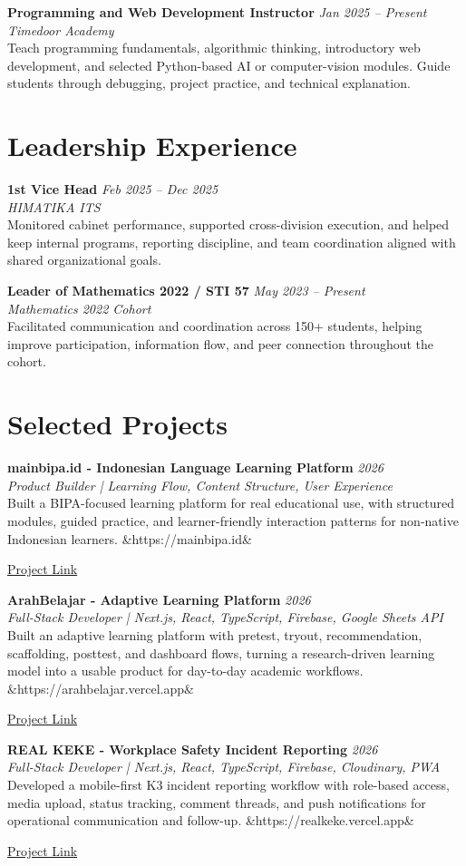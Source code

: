 \documentclass[a4paper,10pt]{article}
\newcommand{\entry}[4]{%
  \textbf{#1} \hfill \textit{#3}\\
  \textit{#2}\\
  {\small #4}\vspace{4pt}
}
\newcommand{\project}[5]{%
  \textbf{#1} \hfill \textit{#2}\\
  \textit{\small #3}\\
  {\small #4}
  \ifx&#5& \else \par{\small \href{#5}{Project Link}} \fi
  \vspace{4pt}
}
\begin{document}
\entry
  {Programming and Web Development Instructor}
  {Timedoor Academy}
  {Jan 2025 -- Present}
  {Teach programming fundamentals, algorithmic thinking, introductory web development, and selected Python-based AI or computer-vision modules. Guide students through debugging, project practice, and technical explanation.}

\section{Leadership Experience}
\entry
  {1st Vice Head}
  {HIMATIKA ITS}
  {Feb 2025 -- Dec 2025}
  {Monitored cabinet performance, supported cross-division execution, and helped keep internal programs, reporting discipline, and team coordination aligned with shared organizational goals.}

\entry
  {Leader of Mathematics 2022 / STI 57}
  {Mathematics 2022 Cohort}
  {May 2023 -- Present}
  {Facilitated communication and coordination across 150+ students, helping improve participation, information flow, and peer connection throughout the cohort.}

\section{Selected Projects}
\project
  {mainbipa.id - Indonesian Language Learning Platform}
  {2026}
  {Product Builder | Learning Flow, Content Structure, User Experience}
  {Built a BIPA-focused learning platform for real educational use, with structured modules, guided practice, and learner-friendly interaction patterns for non-native Indonesian learners.}
  {https://mainbipa.id}

\project
  {ArahBelajar - Adaptive Learning Platform}
  {2026}
  {Full-Stack Developer | Next.js, React, TypeScript, Firebase, Google Sheets API}
  {Built an adaptive learning platform with pretest, tryout, recommendation, scaffolding, posttest, and dashboard flows, turning a research-driven learning model into a usable product for day-to-day academic workflows.}
  {https://arahbelajar.vercel.app}

\project
  {REAL KEKE - Workplace Safety Incident Reporting}
  {2026}
  {Full-Stack Developer | Next.js, React, TypeScript, Firebase, Cloudinary, PWA}
  {Developed a mobile-first K3 incident reporting workflow with role-based access, media upload, status tracking, comment threads, and push notifications for operational communication and follow-up.}
  {https://realkeke.vercel.app}
\end{document}
